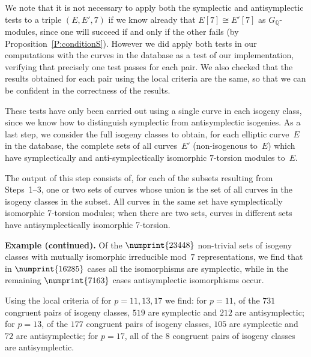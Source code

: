 \documentclass[twoside,leqno,symbols-for-thanks, draft]{rmi}
\numberwithin{equation}{section}
\newcommand{\Q}{\mathbb{Q}}
\theoremstyle{remark}
\begin{document}
We note that it is not necessary to apply both the symplectic and
antisymplectic tests to a triple $(E,E',7)$ if we know already that
$E[7]\cong E'[7]$ as $G_\Q$-modules, since one will succeed if and only if the other
fails (by Proposition~\ref{P:conditionS}).  However we did apply both
tests in our computations with the curves in the database as a test of
our implementation, verifying that precisely one test passes for each
pair.  We also checked that the results obtained for each pair using
the local criteria are the same, so that we can be confident in the
correctness of the results.

These tests have only been carried out using a single curve in each
isogeny class, since we know how to distinguish symplectic from
antisymplectic isogenies.  As a last step, we consider the full isogeny classes
to obtain, for each elliptic curve~$E$ in the database, the complete sets of all curves~$E'$ (non-isogenous to~$E$) which have
symplectically and anti-symplectically isomorphic $7$-torsion modules to~$E$.

The output of this step consists of, for each of the subsets resulting
from Steps~1--3, one or two sets of curves whose union is the set of
all curves in the isogeny classes in the subset.  All curves in the
same set have symplectically isomorphic 7-torsion modules; when there
are two sets, curves in different sets have antisymplectically
isomorphic 7-torsion.




{\bf Example (continued).}  Of the $\numprint{23448}$ non-trivial sets
of isogeny classes with mutually isomorphic irreducible mod~$7$
representations, we find that in $\numprint{16285}$ cases all the
isomorphisms are symplectic, while in the remaining $\numprint{7163}$
cases antisymplectic isomorphisms occur.

Using the local criteria of \cite{FKSym} for $p=11, 13, 17$ we find:
for $p=11$, of the $731$ congruent pairs of isogeny classes, $519$ are
symplectic and $212$ are antisymplectic; for $p=13$, of the $177$
congruent pairs of isogeny classes, $105$ are symplectic and $72$ are
antisymplectic; for $p=17$, all of the $8$ congruent pairs of isogeny
classes are antisymplectic.
\end{document}
